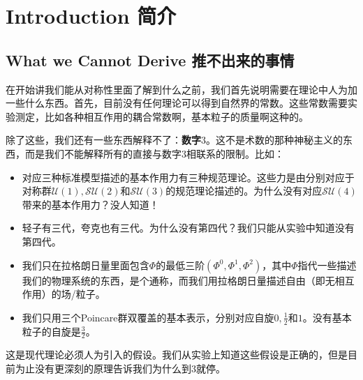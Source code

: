 


\chapter[简介]{Introduction 简介}\label{chap1}

\section[推不出来的事情]{What we Cannot Derive 推不出来的事情}\label{sec1.1}

在开始讲我们能从对称性里面了解到什么之前，我们首先说明需要在理论中人为加一些什么东西。首先，目前没有任何理论可以得到自然界的常数。这些常数需要实验测定，比如各种相互作用的耦合常数啊，基本粒子的质量啊这种的。

除了这些，我们还有一些东西解释不了：{\bf 数字$3$}。这不是术数的那种神秘主义的东西，而是我们不能解释所有的直接与数字$3$相联系的限制。比如：

\begin{itemize}
\item 对应三种标准模型描述的基本作用力有三种规范理论。这些力是由分别对应于对称群$\mathcal{U}(1), \mathcal{SU}(2)$和$\mathcal{SU}(3)$的规范理论描述的。为什么没有对应$\mathcal{SU}(4)$带来的基本作用力？没人知道！
\item 轻子有三代，夸克也有三代。为什么没有第四代？我们只能从实验中知道没有第四代。
\item 我们只在拉格朗日量里面包含$\Phi$的最低三阶$(\Phi^0, \Phi^1, \Phi^2)$，其中$\Phi$指代一些描述我们的物理系统的东西，是个通称，而我们用拉格朗日量描述自由（即无相互作用）的场/粒子。
\item 我们只用三个Poincare群双覆盖的基本表示，分别对应自旋$0, \tfrac{1}{2}$和$1$。没有基本粒子的自旋是$\tfrac{3}{2}$。
\end{itemize}

这是现代理论必须人为引入的假设。我们从实验上知道这些假设是正确的，但是目前为止没有更深刻的原理告诉我们为什么到$3$就停。

